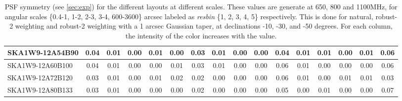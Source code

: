 \begin{table}[H]
{{\begin{tabular}{|lccccc||ccccc||ccccc|}
SKA1W9-12A54B90 & 0.04 \cellcolor{blue!60.00} & 0.01 \cellcolor{red!18.00} & 0.00 \cellcolor{green!18.00} & 0.01 \cellcolor{orange!60.00} & 0.00 \cellcolor{purple!18.00} & 0.03 \cellcolor{blue!60.00} & 0.01 \cellcolor{red!60.00} & 0.00 \cellcolor{green!18.00} & 0.00 \cellcolor{orange!18.00} & 0.04 \cellcolor{purple!32.00} & 0.01 \cellcolor{blue!39.00} & 0.01 \cellcolor{red!60.00} & 0.00 \cellcolor{green!18.00} & 0.01 \cellcolor{orange!60.00} & 0.06 \cellcolor{purple!43.20}\\ \hline 
SKA1W9-12A60B100 & 0.04 \cellcolor{blue!60.00} & 0.01 \cellcolor{red!18.00} & 0.00 \cellcolor{green!18.00} & 0.00 \cellcolor{orange!18.00} & 0.01 \cellcolor{purple!39.00} & 0.03 \cellcolor{blue!60.00} & 0.01 \cellcolor{red!60.00} & 0.00 \cellcolor{green!18.00} & 0.00 \cellcolor{orange!18.00} & 0.06 \cellcolor{purple!60.00} & 0.01 \cellcolor{blue!39.00} & 0.00 \cellcolor{red!18.00} & 0.00 \cellcolor{green!18.00} & 0.00 \cellcolor{orange!18.00} & 0.06 \cellcolor{purple!43.20}\\ \hline 
SKA1W9-12A72B120 & 0.03 \cellcolor{blue!18.00} & 0.01 \cellcolor{red!18.00} & 0.00 \cellcolor{green!18.00} & 0.01 \cellcolor{orange!60.00} & 0.02 \cellcolor{purple!60.00} & 0.02 \cellcolor{blue!18.00} & 0.00 \cellcolor{red!18.00} & 0.00 \cellcolor{green!18.00} & 0.00 \cellcolor{orange!18.00} & 0.06 \cellcolor{purple!60.00} & 0.01 \cellcolor{blue!39.00} & 0.00 \cellcolor{red!18.00} & 0.01 \cellcolor{green!60.00} & 0.01 \cellcolor{orange!60.00} & 0.03 \cellcolor{purple!18.00}\\ \hline 
SKA1W9-12A80B133 & 0.03 \cellcolor{blue!18.00} & 0.01 \cellcolor{red!18.00} & 0.00 \cellcolor{green!18.00} & 0.00 \cellcolor{orange!18.00} & 0.00 \cellcolor{purple!18.00} & 0.02 \cellcolor{blue!18.00} & 0.00 \cellcolor{red!18.00} & 0.00 \cellcolor{green!18.00} & 0.00 \cellcolor{orange!18.00} & 0.05 \cellcolor{purple!46.00} & 0.00 \cellcolor{blue!18.00} & 0.01 \cellcolor{red!60.00} & 0.00 \cellcolor{green!18.00} & 0.00 \cellcolor{orange!18.00} & 0.07 \cellcolor{purple!51.60}\\ \hline 
\end{tabular}}
\vspace{-0.300000cm}
\hspace{1cm} 

\vspace{.25cm}
\caption{PSF symmetry (see \autoref{sec:exp})  for the different layouts at different scales. These values are generate at 650, 800 and 1100MHz, for angular scales \{0.4-1, 1-2, 2-3, 3-4, 600-3600\} arcsec labeled as {\it resbin} \{1, 2, 3, 4, 5\} respectively. This is done for natural, robust-2 weighting and robust-2 weighting with a 1 arcsec Gaussian taper, at declinations -10, -30, and -50 degrees. For each column, the intensity of the color increases with the value.}\label{tab:psf_sym}}
 \end{table}
